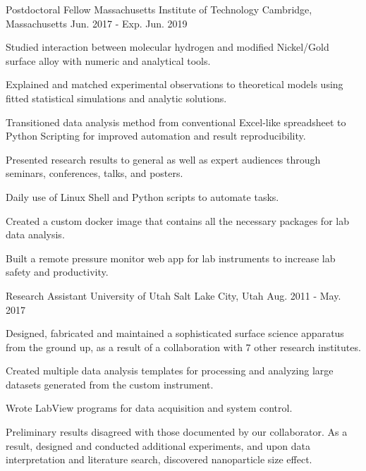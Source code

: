 


\begin{cventries}


\cventry
{Postdoctoral Fellow}
{Massachusetts Institute of Technology}
{Cambridge, Massachusetts}
{Jun. 2017 - Exp. Jun. 2019}
{
\begin{cvitems}
\item {Studied interaction between molecular hydrogen and modified Nickel/Gold
    surface alloy with numeric and analytical tools.}
\item {Explained and matched experimental observations to theoretical models
    using fitted statistical simulations and analytic solutions.}
\item {Transitioned data analysis method from conventional Excel-like
    spreadsheet to Python Scripting for improved automation and result
    reproducibility.}
\item {Presented research results to general as well as expert audiences
    through seminars, conferences, talks, and posters.}
\item {Daily use of Linux Shell and Python scripts to automate tasks.}
\item {Created a custom docker image that contains all the necessary packages
    for lab data analysis.}
\item {Built a remote pressure monitor web app for lab instruments to increase
    lab safety and productivity.}
\end{cvitems}
}


\cventry
{Research Assistant}
{University of Utah}
{Salt Lake City, Utah}
{Aug. 2011 - May. 2017}
{
\begin{cvitems}
\item {Designed, fabricated and maintained a sophisticated surface science
    apparatus from the ground up, as a result of a collaboration with 7 other
    research institutes.}
\item {Created multiple data analysis templates for processing and analyzing
    large datasets generated from the custom instrument.}
\item {Wrote LabView programs for data acquisition and system control.}
\item {Preliminary results disagreed with those documented by our collaborator.
    As a result, designed and conducted additional experiments, and upon data
    interpretation and literature search, discovered nanoparticle size effect.}
\end{cvitems}
}


\end{cventries}